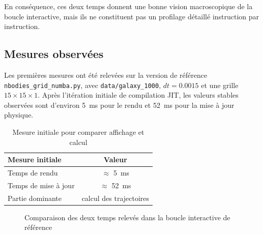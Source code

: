 En conséquence, ces deux temps donnent une bonne vision macroscopique de la boucle interactive, mais ils ne constituent pas un profilage détaillé instruction par instruction.

\subsection{Mesures observées}

Les premières mesures ont été relevées sur la version de référence \texttt{nbodies\_grid\_numba.py}, avec \texttt{data/galaxy\_1000}, \(dt = 0.0015\) et une grille \(15 \times 15 \times 1\). Après l'itération initiale de compilation JIT, les valeurs stables observées sont d'environ \SI{5}{ms} pour le rendu et \SI{52}{ms} pour la mise à jour physique.

\begin{table}[H]
    \centering
    \begin{tabular}{l c}
        \toprule
        \textbf{Mesure initiale} & \textbf{Valeur} \\
        \midrule
        Temps de rendu & \(\approx\) \SI{5}{ms} \\
        Temps de mise à jour & \(\approx\) \SI{52}{ms} \\
        Partie dominante & calcul des trajectoires \\
        \bottomrule
    \end{tabular}
    \caption{Mesure initiale pour comparer affichage et calcul}
    \label{tab:initial_render_update}
\end{table}

\begin{figure}[H]
    \centering
    
    \caption{Comparaison des deux temps relevés dans la boucle interactive de référence}
    \label{fig:initial_render_update}
\end{figure}
